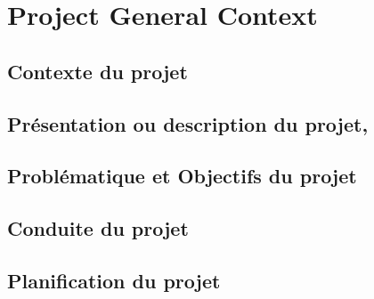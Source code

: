 

\setcounter{mtc}{7}
\chapter{Project General Context }%
\label{chap:chapter_one}
\minitoc
\section{Contexte du projet}
\section{Présentation ou description du projet,}
\section{Problématique et Objectifs du projet}
\section{Conduite du projet}
\section{Planification du projet}
